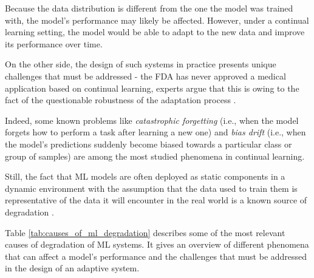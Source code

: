 \documentclass[../main.tex]{subfiles}
\begin{document}
    Because the data distribution is different from the one the model was trained with, the model's performance may likely be affected. However, under a continual learning setting, the model would be able to adapt to the new data and improve its performance over time. 

    
    On the other side, the design of such systems in practice presents unique challenges that must be addressed - the FDA has never approved a medical application based on continual learning, experts argue that this is owing to the fact of the questionable robustness of the adaptation process \cite{vokingerContinualLearningMedical2021}. 
    
    Indeed, some known problems like \textit{catastrophic forgetting} (i.e., when the model forgets how to perform a task after learning a new one) and \textit{bias drift} (i.e., when the model's predictions suddenly become biased towards a particular class or group of samples) are among the most studied phenomena in continual learning.
    
    
    Still, the fact that ML models are often deployed as static components in a dynamic environment with the assumption that the data used to train them is representative of the data it will encounter in the real world is a known source of degradation \cite{vokingerContinualLearningMedical2021}.

    Table \ref{tab:causes_of_ml_degradation} describes some of the most relevant causes of degradation of ML systems. It gives an overview of different phenomena that can affect a model's performance and the challenges that must be addressed in the design of an adaptive system.
\end{document}

